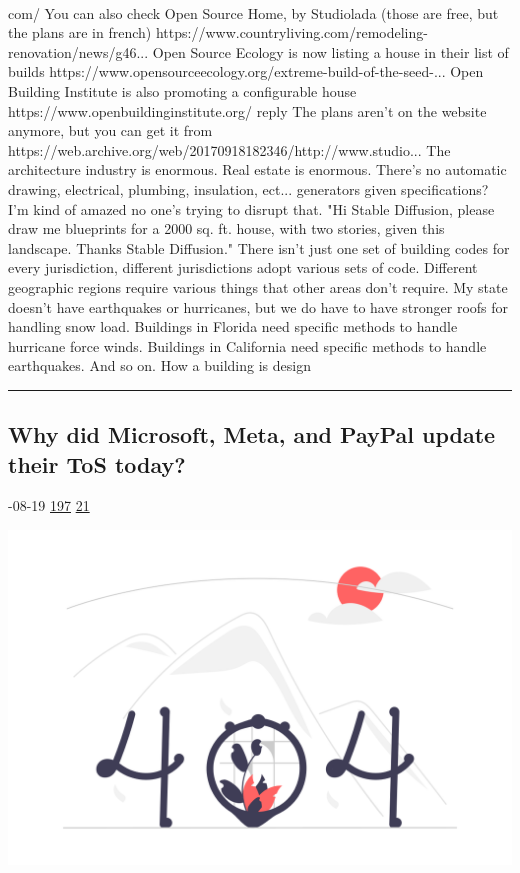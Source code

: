 \documentclass[10pt,a4paper]{article}
\begin{document}
\begin{multicols*}{2}
\paragraph{}
com/
You can also check Open Source Home, by Studiolada (those are free, but the plans are in french)
https://www.countryliving.com/remodeling-renovation/news/g46...
Open Source Ecology is now listing a house in their list of builds
https://www.opensourceecology.org/extreme-build-of-the-seed-...
Open Building Institute is also promoting a configurable house
https://www.openbuildinginstitute.org/
reply
The plans aren't on the website anymore, but you can get it from https://web.archive.org/web/20170918182346/http://www.studio...
The architecture industry is enormous. Real estate is enormous. There's no automatic drawing, electrical, plumbing, insulation, ect... generators given specifications? I'm kind of amazed no one's trying to disrupt that. "Hi Stable Diffusion, please draw me blueprints for a 2000 sq. ft. house, with two stories, given this landscape. Thanks Stable Diffusion."
There isn’t just one set of building codes for every jurisdiction, different jurisdictions adopt various sets of code.
Different geographic regions require various things that other areas don’t require. My state doesn’t have earthquakes or hurricanes, but we do have to have stronger roofs for handling snow load. Buildings in Florida need specific methods to handle hurricane force winds. Buildings in California need specific methods to handle earthquakes. And so on. How a building is design
\par\noindent\textcolor{red}{\rule{\linewidth}{0.2mm}}
\vfill
\null
\noindent\begin{minipage}{\linewidth}
\subsection{Why did Microsoft, Meta, and PayPal update their ToS today?}
\textsc{\footnotesize
{\scriptsize\faCalendar}-08-19 
{\scriptsize\faThumbsOUp}\space 
\href{}{197} 
{\scriptsize\faComments}\space 
\href{}{21} 
}
\par\medskip\noindent
\href{https://news.ycombinator.com/item?id=37185461\&utm\_source=hackernewsletter\&utm\_medium=email\&utm\_term=ask\_hn}{
    \includegraphics[width=0.99\linewidth]{notfound.png}
}
\end{minipage}

\end{multicols*}
\end{document}
